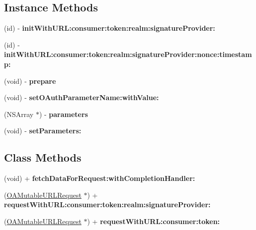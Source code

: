 \subsection*{Instance Methods}
\begin{DoxyCompactItemize}
\item 
\mbox{\label{interfaceOAMutableURLRequest_a9bf50e96dc5da7b96277313678e0cea8}} 
(id) -\/ {\bfseries init\+With\+U\+R\+L\+:consumer\+:token\+:realm\+:signature\+Provider\+:}
\item 
\mbox{\label{interfaceOAMutableURLRequest_acab92d64d1e7a45573c28d74eb299ef9}} 
(id) -\/ {\bfseries init\+With\+U\+R\+L\+:consumer\+:token\+:realm\+:signature\+Provider\+:nonce\+:timestamp\+:}
\item 
\mbox{\label{interfaceOAMutableURLRequest_a85905a8fd26337bdf3ffe76c118f42b9}} 
(void) -\/ {\bfseries prepare}
\item 
\mbox{\label{interfaceOAMutableURLRequest_a3f9ae61d41c15f157656a56922bee732}} 
(void) -\/ {\bfseries set\+O\+Auth\+Parameter\+Name\+:with\+Value\+:}
\item 
\mbox{\label{interfaceOAMutableURLRequest_aeaf0030ad27c1e4c710188cb42b6f636}} 
(N\+S\+Array $\ast$) -\/ {\bfseries parameters}
\item 
\mbox{\label{interfaceOAMutableURLRequest_ad452bc87f567b98a0b3b6b978d158a8c}} 
(void) -\/ {\bfseries set\+Parameters\+:}
\end{DoxyCompactItemize}
\subsection*{Class Methods}
\begin{DoxyCompactItemize}
\item 
\mbox{\label{interfaceOAMutableURLRequest_ad06b4081dc410fa63cc5433a570388f5}} 
(void) + {\bfseries fetch\+Data\+For\+Request\+:with\+Completion\+Handler\+:}
\item 
\mbox{\label{interfaceOAMutableURLRequest_af11c0ce3426c6ccde4617c9a97c1b7dc}} 
(\hyperlink{interfaceOAMutableURLRequest}{O\+A\+Mutable\+U\+R\+L\+Request} $\ast$) + {\bfseries request\+With\+U\+R\+L\+:consumer\+:token\+:realm\+:signature\+Provider\+:}
\item 
\mbox{\label{interfaceOAMutableURLRequest_ae2877726d8f71578c93fce7287865c55}} 
(\hyperlink{interfaceOAMutableURLRequest}{O\+A\+Mutable\+U\+R\+L\+Request} $\ast$) + {\bfseries request\+With\+U\+R\+L\+:consumer\+:token\+:}
\end{DoxyCompactItemize}
